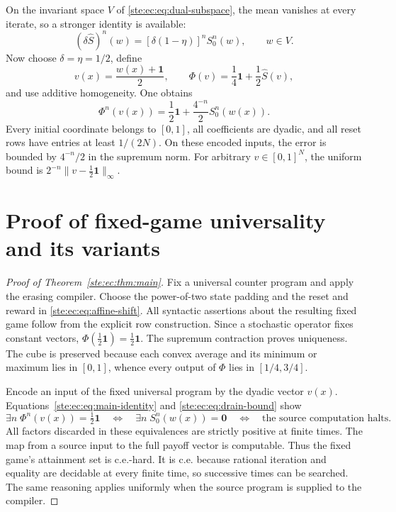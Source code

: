 \documentclass[11pt,letterpaper]{article}
\theoremstyle{definition}
\theoremstyle{remark}
\newcommand{\one}{\mathbf 1}
\newcommand{\zero}{\mathbf 0}
\begin{document}
On the invariant space $V$ of \eqref{ste:ec:eq:dual-subspace}, the mean vanishes
at every iterate, so a stronger identity is available:
\begin{equation}
 (\delta\widehat S)^n(w)
       =[\delta(1-\eta)]^nS_0^n(w),\qquad w\in V.
 \label{ste:ec:eq:dual-reset}
\end{equation}
Now choose $\delta=\eta=1/2$, define
\begin{equation}
 v(x)=\frac{w(x)+\one}{2},\qquad
 \Phi(v)=\frac14\one+\frac12\widehat S(v),
 \label{ste:ec:eq:affine-shift}
\end{equation}
and use additive homogeneity. One obtains
\begin{equation}
 \boxed{\displaystyle
 \Phi^n(v(x))=\frac12\one+\frac{4^{-n}}2S_0^n(w(x)).}
 \label{ste:ec:eq:main-identity}
\end{equation}
Every initial coordinate belongs to $[0,1]$, all coefficients are dyadic,
and all reset rows have entries at least $1/(2N)$. On these encoded inputs,
the error is bounded by $4^{-n}/2$ in the supremum norm. For arbitrary
$v\in[0,1]^N$, the uniform bound is $2^{-n}\|v-\tfrac12\one\|_\infty$.

\section{Proof of fixed-game universality and its variants}
\label{ste:ec:sec:universality}

\begin{proof}[Proof of Theorem~\ref{ste:ec:thm:main}]
Fix a universal counter program and apply the erasing compiler.
Choose the power-of-two state padding and the reset and reward in
\eqref{ste:ec:eq:affine-shift}. All syntactic assertions about the resulting
fixed game follow from the explicit row construction.
Since a stochastic operator fixes constant vectors,
$\Phi(\tfrac12\one)=\tfrac12\one$. The supremum contraction proves
uniqueness. The cube is preserved because each convex average and its
minimum or maximum lies in $[0,1]$, whence every output of $\Phi$ lies in
$[1/4,3/4]$.

Encode an input of the fixed universal program by the dyadic vector
$v(x)$. Equations~\eqref{ste:ec:eq:main-identity} and
\eqref{ste:ec:eq:drain-bound} show
\[
 \exists n\;\Phi^n(v(x))=\tfrac12\one
 \quad\Longleftrightarrow\quad
 \exists n\;S_0^n(w(x))=\zero
 \quad\Longleftrightarrow\quad
 \text{the source computation halts}.
\]
All factors discarded in these equivalences are strictly positive at
finite times. The map from a source input to the full payoff vector is
computable. Thus the fixed game's attainment set is c.e.-hard. It is
c.e. because rational iteration and equality are decidable at every
finite time, so successive times can be searched. The same reasoning
applies uniformly when the source program is supplied to the compiler.
\end{proof}
\end{document}
